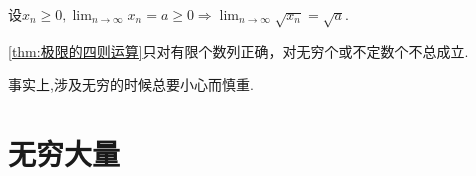 \begin{green}
    \begin{corollary}[开方运算]\label{cor:开方运算}
        设$\displaystyle x_n\geqslant 0,\lim_{n\to\infty}x_n=a\geqslant 0\Longrightarrow\lim_{n\to\infty}\sqrt{x_n}=\sqrt{a}.$
    \end{corollary}
\end{green}
\begin{red}
    \begin{remark}
        \cref{thm:极限的四则运算}只对有限个数列正确，对无穷个或不定数个不总成立.

        事实上,涉及无穷的时候总要小心而慎重.
    \end{remark}
\end{red}
\newpage
\section{无穷大量}
